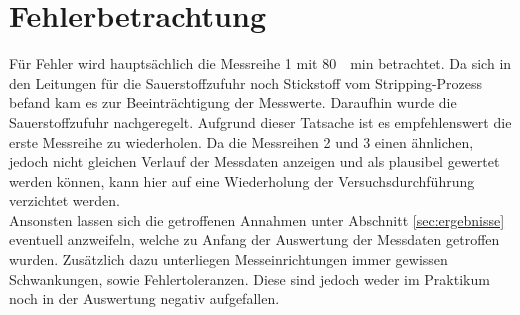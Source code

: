 \section{Fehlerbetrachtung}
\label{sec:fehler}
Für Fehler wird hauptsächlich die Messreihe 1 mit \SI{80}{\per\minute} betrachtet. Da sich in den Leitungen für die Sauerstoffzufuhr noch Stickstoff vom Stripping-Prozess befand kam es zur Beeinträchtigung der Messwerte. Daraufhin wurde die Sauerstoffzufuhr nachgeregelt.  Aufgrund dieser Tatsache ist es empfehlenswert die erste Messreihe zu wiederholen.
Da die Messreihen 2 und 3 einen ähnlichen, jedoch nicht gleichen Verlauf der Messdaten anzeigen und als plausibel gewertet werden können, kann hier auf eine Wiederholung der Versuchsdurchführung verzichtet werden.\\

Ansonsten lassen sich die getroffenen Annahmen unter Abschnitt \ref{sec:ergebnisse} eventuell anzweifeln, welche zu Anfang der Auswertung der Messdaten getroffen wurden. Zusätzlich dazu unterliegen Messeinrichtungen immer gewissen Schwankungen, sowie Fehlertoleranzen. Diese sind jedoch weder im Praktikum noch in der Auswertung negativ aufgefallen.
